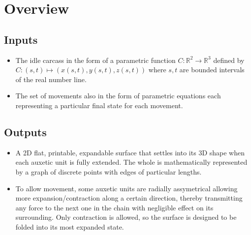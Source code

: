 \documentclass{article}
\begin{document}
\section{Overview}

\subsection{Inputs}
\begin{itemize}
  \item The idle carcass in the form of a parametric function \( C: \mathbb{R}^2 \rightarrow \mathbb{R}^3 \) defined by \( C: (s, t) \mapsto (x(s, t), y(s, t), z(s, t)) \) where \( s, t \) are bounded intervals of the real number line.
  \item The set of movements also in the form of parametric equations each representing a particular final state for each movement.
\end{itemize}

\subsection{Outputs}
\begin{itemize}
  \item A 2D flat, printable, expandable surface that settles into its 3D shape when each auxetic unit is fully extended. The whole is mathematically represented by a graph of discrete points with edges of particular lengths.
  \item To allow movement, some auxetic units are radially assymetrical allowing more expansion/contraction along a certain direction, thereby transmitting any force to the next one in the chain with negligible effect on its surrounding. Only contraction is allowed, so the surface is designed to be folded into its most expanded state.
\end{itemize}
\end{document}
